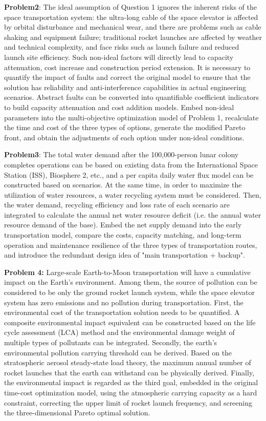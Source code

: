 \textbf{Problem2}:
The ideal assumption of Question 1 ignores the inherent risks of the space transportation system: the ultra-long cable of the space elevator is affected by orbital disturbance and mechanical wear, and there are problems such as cable shaking and equipment failure; traditional rocket launches are affected by weather and technical complexity, and face risks such as launch failure and reduced launch site efficiency. Such non-ideal factors will directly lead to capacity attenuation, cost increase and construction period extension. It is necessary to quantify the impact of faults and correct the original model to ensure that the solution has reliability and anti-interference capabilities in actual engineering scenarios. 
Abstract faults can be converted into quantifiable coefficient indicators to build capacity attenuation and cost addition models. Embed non-ideal parameters into the multi-objective optimization model of Problem 1, recalculate the time and cost of the three types of options, generate the modified Pareto front, and obtain the adjustments of each option under non-ideal conditions.

\textbf{Problem3}:
The total water demand after the 100,000-person lunar colony completes operations can be based on existing data from the International Space Station (ISS), Biosphere 2, etc., and a per capita daily water flux model can be constructed based on scenarios. At the same time, in order to maximize the utilization of water resources, a water recycling system must be considered. Then, the water demand, recycling efficiency and loss rate of each scenario are integrated to calculate the annual net water resource deficit (i.e. the annual water resource demand of the base). Embed the net supply demand into the early transportation model, compare the costs, capacity matching, and long-term operation and maintenance resilience of the three types of transportation routes, and introduce the redundant design idea of ​​"main transportation + backup".

\textbf{Problem 4:}
Large-scale Earth-to-Moon transportation will have a cumulative impact on the Earth's environment. Among them, the source of pollution can be considered to be only the ground rocket launch system, while the space elevator system has zero emissions and no pollution during transportation. First, the environmental cost of the transportation solution needs to be quantified. A composite environmental impact equivalent can be constructed based on the life cycle assessment (LCA) method and the environmental damage weight of multiple types of pollutants can be integrated. Secondly, the earth's environmental pollution carrying threshold can be derived. Based on the stratospheric aerosol steady-state load theory, the maximum annual number of rocket launches that the earth can withstand can be physically derived. Finally, the environmental impact is regarded as the third goal, embedded in the original time-cost optimization model, using the atmospheric carrying capacity as a hard constraint, correcting the upper limit of rocket launch frequency, and screening the three-dimensional Pareto optimal solution.

